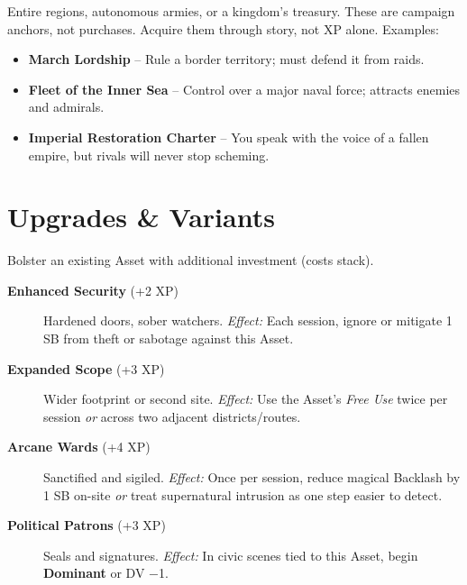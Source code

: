 \begin{tcolorbox}[colback=black!3!white,colframe=black!60!white,title=Legacy Assets (25+ XP)]
Entire regions, autonomous armies, or a kingdom's treasury. These are campaign anchors, not purchases. Acquire them through story, not XP alone. Examples:
\begin{itemize}
  \item \textbf{March Lordship} – Rule a border territory; must defend it from raids.
  \item \textbf{Fleet of the Inner Sea} – Control over a major naval force; attracts enemies and admirals.
  \item \textbf{Imperial Restoration Charter} – You speak with the voice of a fallen empire, but rivals will never stop scheming.
\end{itemize}
\end{tcolorbox}

\section{Upgrades \& Variants}
Bolster an existing Asset with additional investment (costs stack).
\begin{description}
  \item[\textbf{Enhanced Security} (+2 XP)]  Hardened doors, sober watchers. \emph{Effect:} Each session, ignore or mitigate 1 SB from theft or sabotage against this Asset.

  \item[\textbf{Expanded Scope} (+3 XP)]  Wider footprint or second site. \emph{Effect:} Use the Asset's \emph{Free Use} twice per session \emph{or} across two adjacent districts/routes.

  \item[\textbf{Arcane Wards} (+4 XP)]  Sanctified and sigiled. \emph{Effect:} Once per session, reduce magical Backlash by 1 SB on-site \emph{or} treat supernatural intrusion as one step easier to detect.

  \item[\textbf{Political Patrons} (+3 XP)]  Seals and signatures. \emph{Effect:} In civic scenes tied to this Asset, begin \textbf{Dominant} or DV −1.
\end{description}


